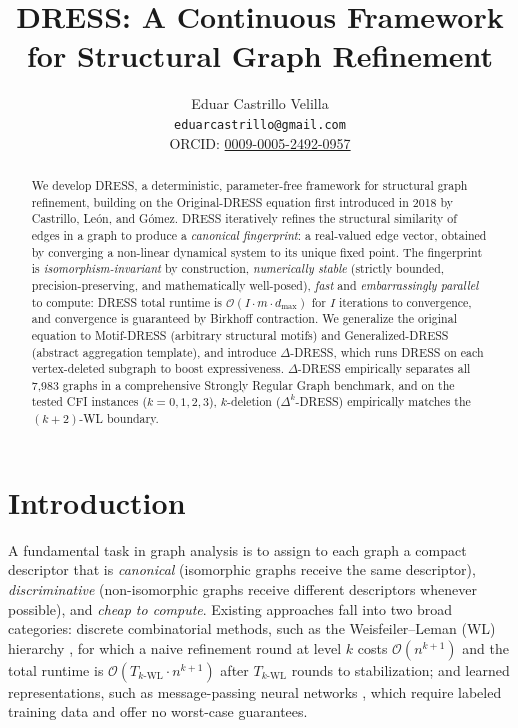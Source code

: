 \documentclass[11pt,a4paper]{article}
\title{DRESS: A Continuous Framework for Structural Graph Refinement}
\author{Eduar Castrillo Velilla \\ \texttt{eduarcastrillo@gmail.com} \\ ORCID: \href{https://orcid.org/0009-0005-2492-0957}{0009-0005-2492-0957}}
\date{}
\begin{document}
\maketitle

\begin{abstract}
We develop DRESS, a deterministic, parameter-free framework for structural graph refinement, building on the Original-DRESS equation first introduced in 2018 by Castrillo, Le\'on, and G\'omez. DRESS iteratively refines the structural similarity of edges in a graph to produce a \emph{canonical fingerprint}: a real-valued edge vector, obtained by converging a non-linear dynamical system to its unique fixed point. The fingerprint is \emph{isomorphism-invariant} by construction, \emph{numerically stable} (strictly bounded, precision-preserving, and mathematically well-posed), \emph{fast} and \emph{embarrassingly parallel} to compute: DRESS total runtime is $\mathcal{O}(I \cdot m \cdot d_{\max})$ for $I$ iterations to convergence, and convergence is guaranteed by Birkhoff contraction. We generalize the original equation to Motif-DRESS (arbitrary structural motifs) and Generalized-DRESS (abstract aggregation template), and introduce $\Delta$-DRESS, which runs DRESS on each vertex-deleted subgraph to boost expressiveness. $\Delta$-DRESS empirically separates all 7{,}983 graphs in a comprehensive Strongly Regular Graph benchmark, and on the tested CFI instances ($k = 0,1,2,3$), $k$-deletion ($\Delta^k$-DRESS) empirically matches the $(k{+}2)$-WL boundary.
\end{abstract}

\section{Introduction}
A fundamental task in graph analysis is to assign to each graph a compact descriptor that is \emph{canonical} (isomorphic graphs receive the same descriptor), \emph{discriminative} (non-isomorphic graphs receive different descriptors whenever possible), and \emph{cheap to compute}. Existing approaches fall into two broad categories: discrete combinatorial methods, such as the Weisfeiler--Leman (WL) hierarchy \cite{weisfeiler1968reduction, cai1992optimal}, for which a naive refinement round at level $k$ costs $\mathcal{O}(n^{k+1})$ and the total runtime is $\mathcal{O}(T_{k\text{-WL}} \cdot n^{k+1})$ after $T_{k\text{-WL}}$ rounds to stabilization; and learned representations, such as message-passing neural networks \cite{xu2019how, morris2019weisfeiler}, which require labeled training data and offer no worst-case guarantees.
\end{document}
